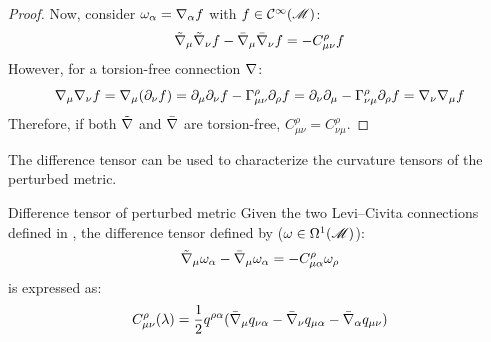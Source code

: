 \begin{proofbox}
\begin{proof}
    Now, consider $ \omega_\alpha = \nabla_\alpha f $ with $ f \in \mathcal{C}^{\infty}(\mathscr{M}) $:
    \begin{equation*}
      \tilde{\nabla}_\mu \tilde{\nabla}_\nu f - \bar{\nabla}_\mu \bar{\nabla}_\nu f = - C^\rho_{\mu \nu} f
    \end{equation*}
    However, for a torsion-free connection $ \nabla $:
    \begin{equation*}
      \nabla_\mu \nabla_\nu f = \nabla_\mu (\partial_\nu f) = \partial_\mu \partial_\nu f - \Gamma^\rho_{\mu \nu} \partial_\rho f = \partial_\nu \partial_\mu - \Gamma^\rho_{\nu \mu} \partial_\rho f = \nabla_\nu \nabla_\mu f
    \end{equation*}
    Therefore, if both $ \tilde{\nabla} $ and $ \bar{\nabla} $ are torsion-free, $ C^\rho_{\mu \nu} = C^\rho_{\nu \mu} $.
  \end{proof}
\end{proofbox}

The difference tensor can be used to characterize the curvature tensors of the perturbed metric.

\begin{proposition}{Difference tensor of perturbed metric}{}
  Given the two Levi--Civita connections defined in , the difference tensor defined by ($ \omega \in \Omega^{1}(\mathscr{M}) $):
  \begin{equation*}
    \tilde{\nabla}_\mu \omega_\alpha - \bar{\nabla}_\mu \omega_\alpha = - C^\rho_{\mu \alpha} \omega_\rho
  \end{equation*}
  is expressed as:
  \begin{equation}
    C^\rho_{\mu \nu}(\lambda) = \frac{1}{2} q^{\rho \alpha} (\bar{\nabla}_\mu q_{\nu \alpha} - \bar{\nabla}_\nu q_{\mu \alpha} - \bar{\nabla}_\alpha q_{\mu \nu})
    \label{eq:perturbation-difference-tensor}
  \end{equation}
\end{proposition}

